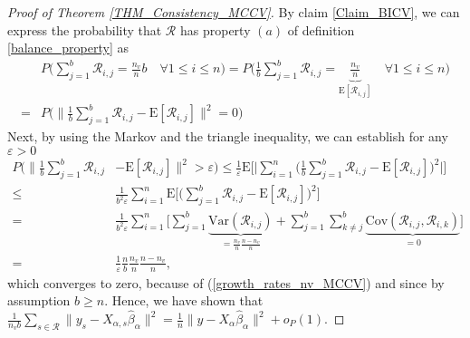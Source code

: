 \documentclass[Research_Module_ES.tex]{subfiles}
\begin{document}
\begin{proof}[Proof of Theorem \ref{THM_Consistency_MCCV}]
	By claim \ref{Claim_BICV}, we can express the probability that $\mathcal{R}$ has property $(a)$ of definition \ref{balance_property} as
	\begin{align*}
	&P\biggl( \sum_{j=1}^b \mathcal{R}_{i,j} = \frac{n_v}{n}b \quad\forall 1\le i \le n\biggr)
	= P\biggl( \frac{1}{b}\sum_{j=1}^b \mathcal{R}_{i,j} = \underbrace{\frac{n_v}{n}}_{\mathrm{E}[\mathcal{R}_{i,j}]} \quad\forall 1\le i \le n\biggr)\\
	=&P\biggl(\biggl\lVert\frac{1}{b}\sum_{j=1}^b \mathcal{R}_{i,j}-\mathrm{E}[\mathcal{R}_{i,j}]\biggr\rVert^2=0\biggr)
	\end{align*}
	Next, by using the Markov and the triangle inequality, we can establish for any $\varepsilon >0$
	\begin{align*}
	P\biggl(\biggl\lVert\frac{1}{b}\sum_{j=1}^b \mathcal{R}_{i,j}&-\mathrm{E}[\mathcal{R}_{i,j}]\biggr\rVert^2>\varepsilon\biggr)
	\le \frac{1}{\varepsilon}\mathrm{E}\biggl[\biggl\lvert \sum_{i=1}^n\biggl(\frac{1}{b}\sum_{j=1}^b \mathcal{R}_{i,j}-\mathrm{E}[\mathcal{R}_{i,j}]\biggr)^2\biggr\rvert\biggr]\\
	\le&\frac{1}{b^2\varepsilon}\sum_{i=1}^n\mathrm{E}\biggl[\biggl(\sum_{j=1}^b \mathcal{R}_{i,j}-\mathrm{E}[\mathcal{R}_{i,j}]\biggr)^2\biggr]\\
	= &\frac{1}{b^2\varepsilon}\sum_{i=1}^n\biggl[\sum_{j=1}^b\underbrace{\mathrm{Var}(\mathcal{R}_{i,j})}_{=\frac{n_v}{n}\frac{n-n_v}{n}}+\sum_{j=1}^b\sum_{k\neq j}^b\underbrace{\mathrm{Cov}(\mathcal{R}_{i,j},\mathcal{R}_{i,k})}_{=0}\biggr]\\
	=&\frac{1}{\varepsilon}\frac{n}{b}\frac{n_v}{n}\frac{n-n_v}{n},
	\end{align*}
	which converges to zero, because of (\ref{growth_rates_nv_MCCV}) and since by assumption $b\ge n$.
	Hence, we have shown that $\frac{1}{n_vb}\sum_{s\in \mathcal{R}}\lVert y_s-X_{\alpha,s}\hat{\beta}_\alpha\rVert^2 = \frac{1}{n}\lVert y-X_{\alpha}\hat{\beta}_\alpha\rVert^2 + o_P(1)$.
	

\end{proof}
\end{document}
